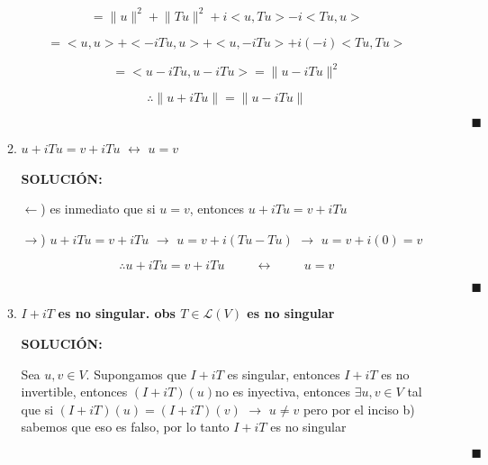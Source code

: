 \documentclass[12pt,a4paper]{article}
\providecommand{\norm}[1]{\lVert#1\rVert}
\begin{document}
\begin{enumerate}
\begin{enumerate}
        \begin{equation*}
            =\norm{u}^2+\norm{Tu}^2+i<u,Tu>-i<Tu,u>
        \end{equation*}
        
        \begin{equation*}
            =<u,u>+<-iTu,u>+<u,-iTu>+i(-i)<Tu,Tu>
        \end{equation*}
        
        \begin{equation*}
            =<u-iTu,u-iTu>=\norm{u-iTu}^2
        \end{equation*}
        
        \begin{equation*}
            \therefore \norm{u+iTu}=\norm{u-iTu}
        \end{equation*}
        
        $\hspace{15cm} \blacksquare$
        
        \item $u+iTu=v+iTu$  $\leftrightarrow$  $u=v$
        
        \textbf{SOLUCIÓN:}
        
        $\leftarrow$) es inmediato que si $u=v$, entonces $u+iTu=v+iTu$
        
        $\rightarrow$) $u+iTu=v+iTu$ $\rightarrow$ $u=v+i(Tu-Tu)$ $\rightarrow$ $u=v+i(0)=v$
        
        \begin{equation*}
            \therefore u+iTu=v+iTu \hspace{1cm}  \leftrightarrow  \hspace{1cm} u=v
        \end{equation*}
        
        $\hspace{15cm} \blacksquare$
        
        \item $I+iT$ \textbf{es no singular.  obs $T\in \mathcal{L}(V)$ es no singular}
        
        \textbf{SOLUCIÓN:}
        
        Sea $u,v \in V$. Supongamos que $I+iT$ es singular, entonces $I+iT$ es no invertible, entonces $(I+iT)(u)$no es inyectiva, entonces $\exists u,v\in V $ tal que si $(I+iT)(u)=(I+iT)(v)$ $\rightarrow$ $u \neq v$ pero por el inciso b) sabemos que eso es falso, por lo tanto $I+iT$ es no singular 
        
        $\hspace{15cm} \blacksquare$
        

\end{enumerate}
\end{enumerate}
\end{document}
